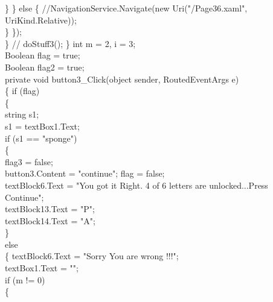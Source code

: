 {{                        \}
                    \}
                    else
                    \{
                        //NavigationService.Navigate(new Uri("/Page36.xaml", UriKind.Relative));\\
                    \}
                \});\\
            \}
            //    doStuff3();
        \}
        int m = 2, i = 3;\\
        Boolean flag = true;\\
        Boolean flag2 = true;\\
        private void button3_Click(object sender, RoutedEventArgs e)\\
        \{
            if (flag)\\
            \{\\
                string s1;\\
                s1 = textBox1.Text;\\
                if (s1 == "sponge")\\
                \{\\
                    flag3 = false;\\
                    button3.Content = "continue"; flag = false;\\
                    textBlock6.Text = "You got it Right. 4 of 6 letters are unlocked...Press Continue";\\
                    textBlock13.Text = "P";\\
                    textBlock14.Text = "A";\\
                \}\\
                else\\
                \{
                    textBlock6.Text = "Sorry You are wrong !!!";\\
                    textBox1.Text = "";\\
                    if (m != 0)\\
                    \{\\

}}
